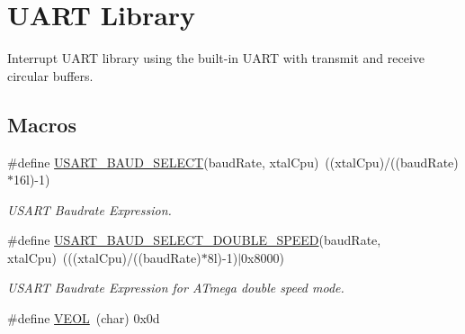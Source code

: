 \hypertarget{group__pfleury__uart}{\section{U\-A\-R\-T Library}
\label{group__pfleury__uart}
}


Interrupt U\-A\-R\-T library using the built-\/in U\-A\-R\-T with transmit and receive circular buffers.  


\subsection*{Macros}
\begin{DoxyCompactItemize}
\item 
\#define \hyperlink{group__pfleury__uart_ga81b884d0763f1925a0efeac39322413d}{U\-S\-A\-R\-T\-\_\-\-B\-A\-U\-D\-\_\-\-S\-E\-L\-E\-C\-T}(baud\-Rate, xtal\-Cpu)~((xtal\-Cpu)/((baud\-Rate)$\ast$16l)-\/1)
\begin{DoxyCompactList}\small\item\em U\-S\-A\-R\-T Baudrate Expression. \end{DoxyCompactList}\item 
\#define \hyperlink{group__pfleury__uart_ga8c35b761fccbace5f3a903cd20eb4b5e}{U\-S\-A\-R\-T\-\_\-\-B\-A\-U\-D\-\_\-\-S\-E\-L\-E\-C\-T\-\_\-\-D\-O\-U\-B\-L\-E\-\_\-\-S\-P\-E\-E\-D}(baud\-Rate, xtal\-Cpu)~(((xtal\-Cpu)/((baud\-Rate)$\ast$8l)-\/1)$|$0x8000)
\begin{DoxyCompactList}\small\item\em U\-S\-A\-R\-T Baudrate Expression for A\-Tmega double speed mode. \end{DoxyCompactList}\item 
\#define \hyperlink{group__pfleury__uart_ga659dbdf07b27a95c6ca57fb14a9e15ad}{V\-E\-O\-L}~(char) 0x0d
\end{DoxyCompactItemize}
